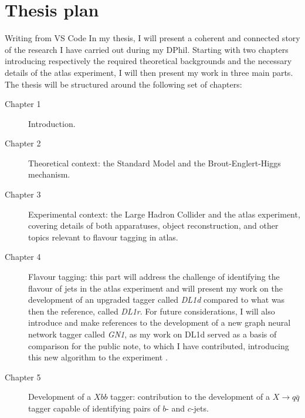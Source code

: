 \section*{Thesis plan}
Writing from VS Code
In my thesis, I will present a coherent and connected story of the research I have carried out during my DPhil. Starting with two chapters introducing respectively the required theoretical backgrounds and the necessary details of the \gls{atlas} experiment, I will then present my work in three main parts.  The thesis will be structured around the following set of chapters:
\begin{description}
\item[Chapter 1] Introduction. \\ \vspace{-15pt}
\item[Chapter 2] Theoretical context: the Standard Model and the Brout-Englert-Higgs mechanism. \\  \vspace{-15pt}
\item[Chapter 3] Experimental context: the Large Hadron Collider and the \gls{atlas} experiment, covering details of both apparatuses, object reconstruction, and other topics relevant to flavour tagging in \gls{atlas}. \\  \vspace{-15pt}
\item[Chapter 4] Flavour tagging: this part will address the challenge of identifying the flavour of jets in the \gls{atlas} experiment and will present my work on the development of an upgraded tagger called \textit{DL1d} compared to what was then the reference, called \textit{DL1r}. For future considerations, I will also introduce and make references to the development of a new graph neural network tagger called \textit{GN1}, as my work on DL1d served as a basis of comparison for the public note, to which I have contributed, introducing this new algorithm to the experiment \cite{ATL-PHYS-PUB-2022-027}. \\  \vspace{-15pt}
\item[Chapter 5] Development of a $Xbb$ tagger: contribution to the development of a $X \rightarrow q\bar{q}$ tagger capable of identifying pairs of $b$- and $c$-jets.

\end{description}
